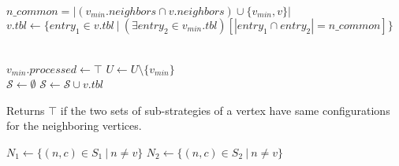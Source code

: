 \documentclass{article}
\newcommand{\strategy}{\ensuremath{\mathcal{S}}}
\newcommand{\set}[1]{\{#1\}}
\begin{document}
\begin{algorithm}
\begin{algorithmic}[1]
			\State $n\_common = |(v_{min}.neighbors \cap v.neighbors) \cup
			\set{v_{min}, v}|$
			\State $v.tbl \leftarrow \set{entry_1\in v.tbl ~|~ (\exists
			entry_2 \in v_{min}.tbl)[|entry_1 \cap entry_2| = n\_common]}$
		\EndFor

		\\
		\State $v_{min}.processed \leftarrow \top$
		\State $U \leftarrow U\setminus \set{v_{min}}$
	\EndWhile
	\\

	\State $\strategy \leftarrow \emptyset$
		\State $\strategy \leftarrow \strategy \cup v.tbl$
	\EndFor
	\State \Return{\strategy}

	\EndProcedure
\end{algorithmic}

\end{algorithm}

\begin{algorithm}
	\caption{\label{alg:has-same-neigh-config}Returns $\top$ if the two
	sets of sub-strategies of a vertex have same configurations for the
	neighboring vertices.}

	\begin{algorithmic}[1]
					\State $N_1 \leftarrow \set{(n,c)\in S_1~|~n \not= v}$
					\State $N_2 \leftarrow \set{(n,c)\in S_2~|~n \not= v}$
					\\

						\State \Return{$\bot$}
					\EndIf
				\EndFor
			\EndFor
			\\
			\State \Return{$\top$}
		\EndProcedure
	\end{algorithmic}
\end{algorithm}
\end{document}
